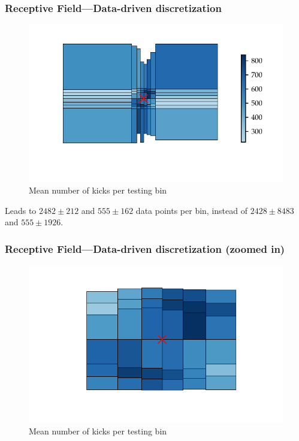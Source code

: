 \documentclass{beamer}
\begin{document}
\begin{frame}
  \frametitle{Receptive Field---Data-driven discretization}
  \begin{figure}
    \centering
  \includegraphics{rf_occupancy_test_beamer}
  \caption*{Mean number of kicks per testing bin}
  \end{figure}
  \vspace{-0.5cm}
Leads to  $2482 \pm 212$ and $555 \pm 162$ data points per bin, instead of \(2428\pm 8483\) and \(555 \pm 1926\).
\end{frame}

\begin{frame}
  \frametitle{Receptive Field---Data-driven discretization (zoomed in)}
  \begin{figure}
  \centering
  \includegraphics{rf_occupancy_test_zoomed_beamer}

   \caption*{Mean number of kicks per testing bin}
 \end{figure}
\end{frame}
\end{document}
